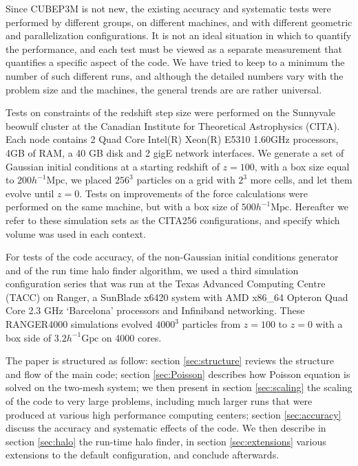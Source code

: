 Since {\small CUBEP3M} is not new, the existing  accuracy and systematic tests were performed by different groups, on different machines,
and with different geometric and parallelization configurations. It is not an ideal situation in which to quantify the performance, and each test must be viewed as a
separate measurement that quantifies a specific aspect of the code. 
We have tried to keep to a minimum the number of such different runs, and although the detailed numbers vary 
with the problem size and the machines, the general trends are are rather universal.

Tests on constraints of the redshift step size were performed 
on the Sunnyvale beowulf cluster at the Canadian Institute for Theoretical Astrophysics (CITA).
Each node contains 2 Quad Core Intel(R) Xeon(R) E5310 1.60GHz processors, 4GB of RAM,  a 40 GB disk and 2 gigE network interfaces. 
We generate a set of Gaussian initial conditions at a starting redshift of $z = 100$, 
with a box size equal to $200 h^{-1}\mbox{Mpc}$, we placed
$256^{3}$  particles on a grid with $2^{3}$ more cells, and let them evolve until $z=0$.
Tests on improvements of the force calculations were performed on the same machine, but with  a box size of $500 h^{-1}\mbox{Mpc}$.
Hereafter we refer to these simulation sets as the CITA256 configurations, and specify which volume was used in each context.

For tests of the code accuracy, of the non-Gaussian initial conditions generator and of the run time halo finder algorithm, 
we used a third simulation configuration series that was run at the Texas Advanced Computing Centre (TACC) on Ranger, a SunBlade 
x6420 system with AMD x86\_64 Opteron Quad Core 2.3 GHz `Barcelona' processors and Infiniband networking.
These RANGER4000 simulations evolved $4000^{3}$ particles 
from $z=100$ to $z=0$ with a box side of $3.2 h^{-1}\mbox{Gpc}$
on 4000 cores.
 

The paper is structured as follow: section \ref{sec:structure} reviews the structure and flow of the main code;
section \ref{sec:Poisson} describes how Poisson equation is solved on the two-mesh system;
we then present in section \ref{sec:scaling} the scaling of the code to very large problems,
including much larger runs that were produced at various high performance computing centers;
section \ref{sec:accuracy}  discuss the accuracy and systematic effects of the code.
 We then describe in section \ref{sec:halo} the run-time halo finder, in section \ref{sec:extensions} various extensions
 to the default configuration, and conclude afterwards.




